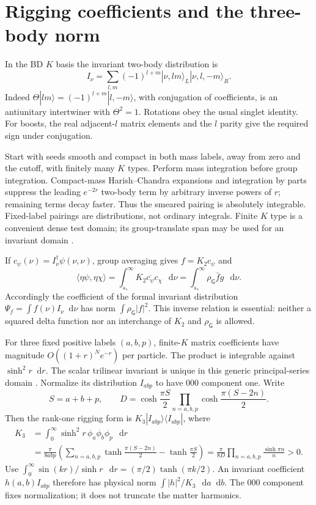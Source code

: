 \documentclass[11pt,a4paper]{article}
\newcommand{\dd}{\mathop{}\!\mathrm d}
\begin{document}
\newpage
\section{Rigging coefficients and the three-body norm}
In the BD $K$ basis the invariant two-body distribution is
\begin{equation}
 I_\nu=\sum_{l,m}(-1)^{l+m}|\nu,lm\rangle_L|\nu,l,-m\rangle_R .
\end{equation}
Indeed $\Theta|lm\rangle=(-1)^{l+m}|l,-m\rangle$, with conjugation
of coefficients, is an antiunitary intertwiner with $\Theta^2=1$.
Rotations obey the usual singlet identity. For boosts, the real adjacent-$l$
matrix elements and the $l$ parity give the required sign under conjugation.

Start with seeds smooth and compact in both mass labels, away from zero
and the cutoff, with finitely many $K$ types. Perform mass integration
before group integration. Compact-mass Harish--Chandra expansions and
integration by parts suppress the leading $e^{-2r}$ two-body term by
arbitrary inverse powers of $r$; remaining terms decay faster.
Thus the smeared pairing is absolutely integrable.
Fixed-label pairings are distributions, not ordinary integrals.
Finite $K$ type is a convenient dense test domain; its group-translate span
may be used for an invariant domain \cite{MM,MY}.

If $c_\psi(\nu)=I_\nu^\dagger\psi(\nu,\nu)$, group averaging gives
$f=K_2c_\psi$ and
\begin{equation}
 \langle\eta\psi,\eta\chi\rangle
 =\int_{s_*}^\infty K_2\overline{c_\psi}c_\chi\,\dd\nu
 =\int_{s_*}^\infty\rho_{\mathsf G}\bar f g\,\dd\nu .
\end{equation}
Accordingly the coefficient of the formal invariant distribution
$\Psi_f=\int f(\nu)I_\nu\dd\nu$ has norm $\int\rho_{\mathsf G}|f|^2$.
This inverse relation is essential: neither a squared delta function
nor an interchange of $K_2$ and $\rho_{\mathsf G}$ is allowed.

For three fixed positive labels $(a,b,p)$, finite-$K$ matrix coefficients
have magnitude $O((1+r)^N e^{-r})$ per particle. The product is integrable
against $\sinh^2r\dd r$. The scalar trilinear invariant is unique in this
generic principal-series domain \cite{DS}. Normalize its distribution
$I_{abp}$ to have $000$ component one. Write
\[
 S=a+b+p,\qquad D=\cosh\frac{\pi S}{2}
       \prod_{n=a,b,p}\cosh\frac{\pi(S-2n)}{2}.
\]
Then the rank-one rigging form is $K_3|I_{abp}\rangle\langle I_{abp}|$, where
\begin{align}
 K_3&=\int_0^\infty\sinh^2r\,\phi_a\phi_b\phi_p\,\dd r\\
 &=\frac{\pi}{8abp}\left(\sum_{n=a,b,p}\tanh\frac{\pi(S-2n)}2
                   -\tanh\frac{\pi S}2\right)
 =\frac{\pi}{8D}\prod_{n=a,b,p}\frac{\sinh\pi n}{n}>0 .
\end{align}
Use $\int_0^\infty\sin(kr)/\sinh r\,\dd r=(\pi/2)\tanh(\pi k/2)$.
An invariant coefficient $h(a,b)I_{abp}$ therefore has physical norm
$\int |h|^2/K_3\,\dd a\dd b$. The $000$ component fixes normalization;
it does not truncate the matter harmonics.
\end{document}
